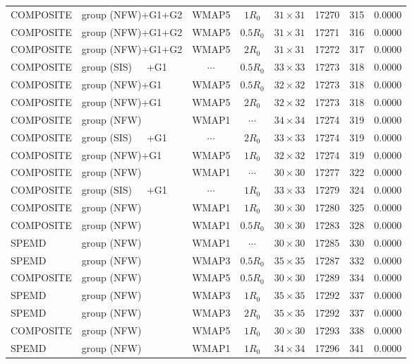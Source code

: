 \documentclass[useAMS,usenatbib]{mnras}
\def\nomicro{$\cdots$}
\def\nodata{$\cdots$}
\begin{document}
\begin{table}
\begin{tabular}{llccccrr}
        COMPOSITE & group (NFW)+G1+G2 &WMAP5 & $1R_{0}$&$31\times31$ & 17270 & 315 & 0.0000\\
        COMPOSITE & group (NFW)+G1+G2 &WMAP5 & $0.5R_{0}$&$31\times31$ & 17271 & 316 & 0.0000\\
        COMPOSITE & group (NFW)+G1+G2 &WMAP5 & $2R_{0}$  &$31\times31$ & 17272 & 317 & 0.0000\\
        COMPOSITE & group (SIS)~~~+G1 &\nodata & $0.5R_{0}$&$33\times33$ & 17273 & 318 & 0.0000\\
        COMPOSITE & group (NFW)+G1    &WMAP5 & $0.5R_{0}$&$32\times32$ & 17273 & 318 & 0.0000\\
        COMPOSITE & group (NFW)+G1    &WMAP5 & $2R_{0}$  &$32\times32$ & 17273 & 318 & 0.0000\\
        COMPOSITE & group (NFW)       &WMAP1 & \nomicro&$34\times34$ & 17274 & 319 & 0.0000\\
        COMPOSITE & group (SIS)~~~+G1 &\nodata&$2R_{0}$ &$33\times33$ & 17274 & 319 & 0.0000\\
        COMPOSITE & group (NFW)+G1    &WMAP5 & $1R_{0}$&$32\times32$ & 17274 & 319 & 0.0000\\
        COMPOSITE & group (NFW)       &WMAP1 & \nomicro&$30\times30$ & 17277 & 322 & 0.0000\\
        COMPOSITE & group (SIS)~~~+G1 &\nodata&$1R_{0}$ &$33\times33$ & 17279 & 324 & 0.0000\\
        COMPOSITE & group (NFW)       &WMAP1 & $1R_{0}$&$30\times30$ & 17280 & 325 & 0.0000\\
        COMPOSITE & group (NFW)       &WMAP1 & $0.5R_{0}$&$30\times30$ & 17283 & 328 & 0.0000\\
        SPEMD     & group (NFW)       &WMAP1 & \nomicro&$30\times30$ & 17285 & 330 & 0.0000\\
        SPEMD     & group (NFW)       &WMAP3 & $0.5R_{0}$&$35\times35$ & 17287 & 332 & 0.0000\\
        COMPOSITE & group (NFW)       &WMAP5 & $0.5R_{0}$&$30\times30$ & 17289 & 334 & 0.0000\\
        SPEMD     & group (NFW)       &WMAP3 & $1R_{0}$&$35\times35$ & 17292 & 337 & 0.0000\\
        SPEMD     & group (NFW)       &WMAP3 & $2R_{0}$&$35\times35$ & 17292 & 337 & 0.0000\\
        COMPOSITE & group (NFW)       &WMAP5 & $1R_{0}$&$30\times30$ & 17293 & 338 & 0.0000\\
        SPEMD     & group (NFW)       &WMAP1 & $1R_{0}$&$34\times34$ & 17296 & 341 & 0.0000\\

\end{tabular}
\end{table}
\end{document}
